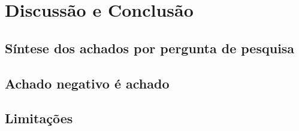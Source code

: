 
\chapter{Discuss\~ao e Conclus\~ao}
\label{cap:conclusao}

\section{S\'intese dos achados por pergunta de pesquisa}
\label{sec:sintese}

%
%
%
%

\section{Achado negativo \'e achado}
\label{sec:negativo}

%

\section{Limita\c{c}\~oes}
\label{sec:limitacoes}

